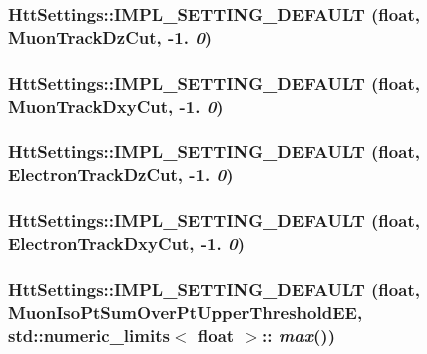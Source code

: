 \hypertarget{classHttSettings_a96cfe871dd9a2c337515ce0aa689834c}{
\subsubsection[{IMPL\_\-SETTING\_\-DEFAULT}]{\setlength{\rightskip}{0pt plus 5cm}HttSettings::IMPL\_\-SETTING\_\-DEFAULT (float, \/  MuonTrackDzCut, \/  -\/1. {\em 0})}}
\label{classHttSettings_a96cfe871dd9a2c337515ce0aa689834c}
\hypertarget{classHttSettings_a600c2c10faad6847cf76443c5688adb3}{
\subsubsection[{IMPL\_\-SETTING\_\-DEFAULT}]{\setlength{\rightskip}{0pt plus 5cm}HttSettings::IMPL\_\-SETTING\_\-DEFAULT (float, \/  MuonTrackDxyCut, \/  -\/1. {\em 0})}}
\label{classHttSettings_a600c2c10faad6847cf76443c5688adb3}
\hypertarget{classHttSettings_aab852c525e62354d9c6efa3d56612087}{
\subsubsection[{IMPL\_\-SETTING\_\-DEFAULT}]{\setlength{\rightskip}{0pt plus 5cm}HttSettings::IMPL\_\-SETTING\_\-DEFAULT (float, \/  ElectronTrackDzCut, \/  -\/1. {\em 0})}}
\label{classHttSettings_aab852c525e62354d9c6efa3d56612087}
\hypertarget{classHttSettings_a10cb15cf8b50311d87ac387cc9ad182d}{
\subsubsection[{IMPL\_\-SETTING\_\-DEFAULT}]{\setlength{\rightskip}{0pt plus 5cm}HttSettings::IMPL\_\-SETTING\_\-DEFAULT (float, \/  ElectronTrackDxyCut, \/  -\/1. {\em 0})}}
\label{classHttSettings_a10cb15cf8b50311d87ac387cc9ad182d}
\hypertarget{classHttSettings_adee678dc804dcbbe8fcf8a8bb1522c66}{
\subsubsection[{IMPL\_\-SETTING\_\-DEFAULT}]{\setlength{\rightskip}{0pt plus 5cm}HttSettings::IMPL\_\-SETTING\_\-DEFAULT (float, \/  MuonIsoPtSumOverPtUpperThresholdEE, \/  std::numeric\_\-limits$<$ float $>$:: {\em max}())}}
